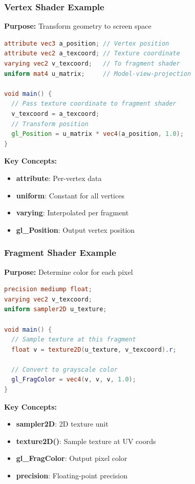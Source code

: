 \begin{frame}[fragile]
\frametitle{Vertex Shader Example}

\textbf{Purpose:} Transform geometry to screen space

\begin{lstlisting}[language=glsl]
attribute vec3 a_position; // Vertex position
attribute vec2 a_texcoord; // Texture coordinate
varying vec2 v_texcoord;   // To fragment shader
uniform mat4 u_matrix;     // Model-view-projection

void main() {
  // Pass texture coordinate to fragment shader
  v_texcoord = a_texcoord;
  // Transform position
  gl_Position = u_matrix * vec4(a_position, 1.0);
}
\end{lstlisting}

\textbf{Key Concepts:}
\begin{itemize}
  \item \textbf{attribute}: Per-vertex data
  \item \textbf{uniform}: Constant for all vertices
  \item \textbf{varying}: Interpolated per fragment
  \item \textbf{gl\_Position}: Output vertex position
\end{itemize}
\end{frame}

\begin{frame}[fragile]
\frametitle{Fragment Shader Example}

\textbf{Purpose:} Determine color for each pixel

\begin{lstlisting}[language=glsl]
precision mediump float;
varying vec2 v_texcoord;
uniform sampler2D u_texture;

void main() {
  // Sample texture at this fragment
  float v = texture2D(u_texture, v_texcoord).r;
  
  // Convert to grayscale color
  gl_FragColor = vec4(v, v, v, 1.0);
}
\end{lstlisting}

\textbf{Key Concepts:}
\begin{itemize}
  \item \textbf{sampler2D}: 2D texture unit
  \item \textbf{texture2D()}: Sample texture at UV coords
  \item \textbf{gl\_FragColor}: Output pixel color
  \item \textbf{precision}: Floating-point precision
\end{itemize}
\end{frame}


